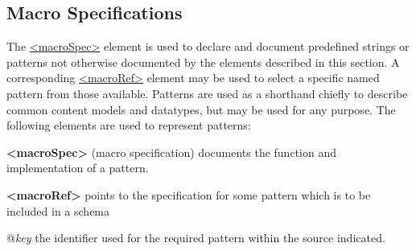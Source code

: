 \subsection[{Macro Specifications}]{Macro Specifications}\label{TDENT}\par
The \hyperref[TEI.macroSpec]{<macroSpec>} element is used to declare and document predefined strings or patterns not otherwise documented by the elements described in this section. A corresponding \hyperref[TEI.macroRef]{<macroRef>} element may be used to select a specific named pattern from those available. Patterns are used as a shorthand chiefly to describe common content models and datatypes, but may be used for any purpose. The following elements are used to represent patterns: 
\begin{sansreflist}
  
\item [\textbf{<macroSpec>}] (macro specification) documents the function and implementation of a pattern.
\item [\textbf{<macroRef>}] points to the specification for some pattern which is to be included in a schema\hfil\\[-10pt]\begin{sansreflist}
    \item[@{\itshape key}]
  the identifier used for the required pattern within the source indicated.
\end{sansreflist}  
\end{sansreflist}

